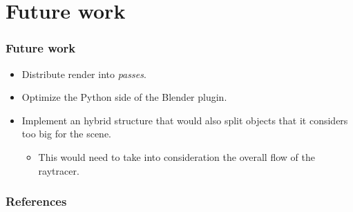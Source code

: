 \documentclass{beamer}
\begin{document}
\section{Future work}
\begin{frame}
  \frametitle{Future work}

\begin{itemize}
\item Distribute render into \emph{passes}.
\item Optimize the Python side of the Blender plugin.
\item Implement an hybrid structure that would also split objects that it considers too big for the scene.
\begin{itemize}
\item This would need to take into consideration the overall flow of
  the raytracer.
\end{itemize}
\end{itemize}

\end{frame}



\begin{frame}[allowframebreaks]
\frametitle{References}

\end{frame}
\end{document}
